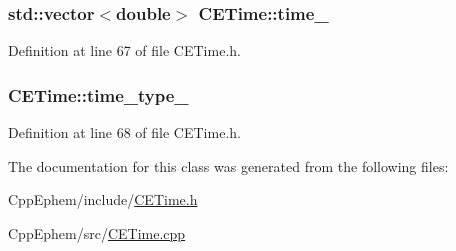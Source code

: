 \subsubsection[{time\+\_\+}]{\setlength{\rightskip}{0pt plus 5cm}std\+::vector$<$double$>$ C\+E\+Time\+::time\+\_\+\hspace{0.3cm}{\ttfamily [protected]}}\label{class_c_e_time_a6fd743f19f38b7e9e76887725fedb6e0}


Definition at line 67 of file C\+E\+Time.\+h.

\hypertarget{class_c_e_time_aa3d0704d43eed2d09dc4f688a78ab44b}{}
\subsubsection[{time\+\_\+type\+\_\+}]{ C\+E\+Time\+::time\+\_\+type\+\_\+\hspace{0.3cm}{\ttfamily [protected]}}\label{class_c_e_time_aa3d0704d43eed2d09dc4f688a78ab44b}


Definition at line 68 of file C\+E\+Time.\+h.



The documentation for this class was generated from the following files\+:\begin{DoxyCompactItemize}
\item 
Cpp\+Ephem/include/\hyperlink{_c_e_time_8h}{C\+E\+Time.\+h}\item 
Cpp\+Ephem/src/\hyperlink{_c_e_time_8cpp}{C\+E\+Time.\+cpp}\end{DoxyCompactItemize}
